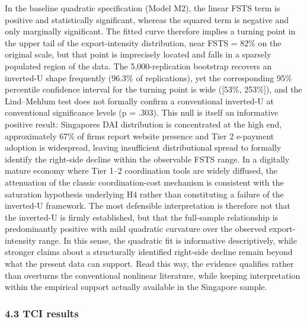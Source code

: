 \documentclass[12pt,a4paper]{article}
\begin{document}
In the baseline quadratic specification (Model M2), the linear FSTS term
is positive and statistically significant, whereas the squared term is
negative and only marginally significant. The fitted curve therefore
implies a turning point in the upper tail of the export-intensity
distribution, near FSTS = 82\% on the original scale, but that point is
imprecisely located and falls in a sparsely populated region of the
data. The 5,000-replication bootstrap recovers an inverted-U shape
frequently (96.3\% of replications), yet the corresponding 95\%
percentile confidence interval for the turning point is wide ({[}53\%,
253\%{]}), and the Lind--Mehlum test does not formally confirm a
conventional inverted-U at conventional significance levels (p = .303).
This null is itself an informative positive result:
Singapore\textquotesingle s DAI distribution is concentrated at the high
end, approximately 67\% of firms report website presence and Tier 2
e-payment adoption is widespread, leaving insufficient distributional
spread to formally identify the right-side decline within the observable
FSTS range. In a digitally mature economy where Tier 1--2 coordination
tools are widely diffused, the attenuation of the classic
coordination-cost mechanism is consistent with the saturation hypothesis
underlying H4 rather than constituting a failure of the inverted-U
framework. The most defensible interpretation is therefore not that the
inverted-U is firmly established, but that the full-sample relationship
is predominantly positive with mild quadratic curvature over the
observed export-intensity range. In this sense, the quadratic fit is
informative descriptively, while stronger claims about a structurally
identified right-side decline remain beyond what the present data can
support. Read this way, the evidence qualifies rather than overturns the
conventional nonlinear literature, while keeping interpretation within
the empirical support actually available in the Singapore sample.

\hypertarget{43-tci-results}{%
\subsubsection{4.3 TCI results}\label{43-tci-results}}
\end{document}
